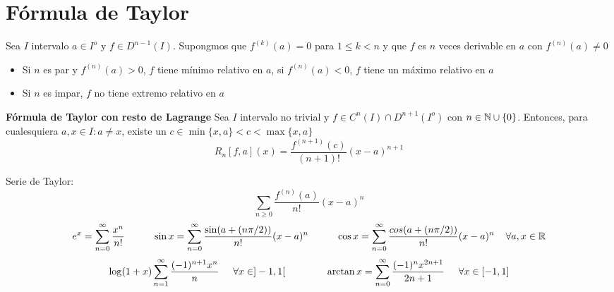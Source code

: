 \section{Fórmula de Taylor}
Sea $I$ intervalo $a\in I^o$ y $f\in D^{n-1}(I)$. Supongmos que $f^{(k)}(a) = 0$ para $1\leq k<n$ y que $f$ es $n$ veces derivable en $a$ con $f^{(n)}(a) \not=0$
\begin{itemize}
	\item Si $n$ es par y $f^{(n)}(a) >0$, $f$ tiene mínimo relativo en $a$, si $f^{(n)}(a) <0$, $f$ tiene un máximo relativo en $a$
	\item Si $n$ es impar, $f$ no tiene extremo relativo en $a$
\end{itemize}
\textbf{Fórmula de Taylor con resto de Lagrange}
Sea $I$ intervalo no trivial y $f\in C^n(I)\cap D^{n+1}(I^o)$ con $n\in\mathbb{N}\cup\{0\}$. Entonces, para cualesquiera $a,x\in I : a\not=x$, existe un $c\in\min\{x,a\}<c<\max\{x,a\}$
$$ R_n[f,a](x) = \frac{f^{(n+1)}(c)}{(n+1)!} (x-a)^{n+1} $$

Serie de Taylor:
$$ \sum_{n\geq0} \frac{f^{(n)}(a)}{n!}(x-a)^n $$
$$ e^x = \sum_{n=0}^{\infty} \frac{x^n}{n!} \hspace{1cm}
\sin x=\sum_{n=0}^{\infty} \frac{\sin (a+(n\pi/2))}{n!} (x-a)^n \hspace{1cm}
\cos x=\sum_{n=0}^{\infty} \frac{cos(a+(n\pi/2))}{n!} (x-a)^n
\hspace{0.4cm}\forall a,x\in\mathbb{R} $$
$$ \log (1+x)\sum_{n=1}^{\infty} \frac{(-1)^{n+1} x^n}{n} \hspace{0.5cm} \forall x\in]-1, 1[\hspace{1.5cm}
\arctan x = \sum_{n=0}^{\infty} \frac{(-1)^n x^{2n+1}}{2n+1}\hspace{0.5cm} 
\forall x\in[-1, 1]$$